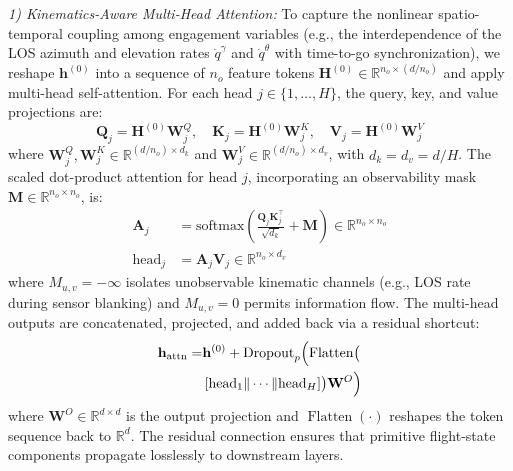 \documentclass[lettersize,journal]{IEEEtran}
\newcommand{\hladd}[1]{{\color{blue}#1}}
\begin{document}
\emph{1) Kinematics-Aware Multi-Head Attention:} To capture the nonlinear spatio-temporal coupling among engagement variables (e.g., \hladd{the interdependence of the LOS azimuth and elevation rates $\dot{q}^{\gamma}$ and $\dot{q}^{\theta}$ with time-to-go synchronization}), we reshape $\mathbf{h}^{(0)}$ into a sequence of $n_o$ feature tokens $\mathbf{H}^{(0)} \in \mathbb{R}^{n_o \times (d/n_o)}$ and apply multi-head self-attention. For each head $j \in \{1, \dots, H\}$, the query, key, and value projections are:
\begin{equation}
\label{eq:qkv}
\mathbf{Q}_j = \mathbf{H}^{(0)}\mathbf{W}_j^{Q}, \quad \mathbf{K}_j = \mathbf{H}^{(0)}\mathbf{W}_j^{K}, \quad \mathbf{V}_j = \mathbf{H}^{(0)}\mathbf{W}_j^{V}
\end{equation}
where $\mathbf{W}_j^{Q}, \mathbf{W}_j^{K} \in \mathbb{R}^{(d/n_o) \times d_k}$ and $\mathbf{W}_j^{V} \in \mathbb{R}^{(d/n_o) \times d_v}$, with $d_k = d_v = d/H$. The scaled dot-product attention for head $j$, incorporating an observability mask $\mathbf{M} \in \mathbb{R}^{n_o \times n_o}$, is:
\begin{align}
\mathbf{A}_j &= \mathrm{softmax}\!\left(\frac{\mathbf{Q}_j\mathbf{K}_j^\top}{\sqrt{d_k}} + \mathbf{M}\right) \in \mathbb{R}^{n_o \times n_o} \label{eq:attention} \\
\mathrm{head}_j &= \mathbf{A}_j\mathbf{V}_j \in \mathbb{R}^{n_o \times d_v} \nonumber
\end{align}
where $M_{u,v} = -\infty$ isolates unobservable kinematic channels (e.g., LOS rate during sensor blanking) and $M_{u,v} = 0$ permits information flow. The multi-head outputs are concatenated, projected, and added back via a residual shortcut:
\begin{equation}
\label{eq:mha_out}
\begin{split}
\mathbf{h}_{\mathrm{attn}} =& \mathbf{h}^{(0)} + \mathrm{Dropout}_{p}\Bigl(\operatorname{Flatten}\bigl( \\
&\left[\mathrm{head}_1 \| \cdots \| \mathrm{head}_H\right]\bigr) \mathbf{W}^{O}\Bigr)
\end{split}
\end{equation}
where $\mathbf{W}^{O} \in \mathbb{R}^{d \times d}$ is the output projection and $\operatorname{Flatten}(\cdot)$ reshapes the token sequence back to $\mathbb{R}^d$. The residual connection ensures that primitive flight-state components propagate losslessly to downstream layers.
\end{document}
